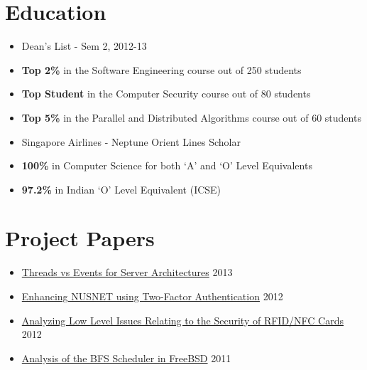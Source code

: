 \documentclass[11pt,a4paper]{moderncv}
\begin{document}
\section{Education}
{\begin{itemize}
    \item Dean's List - Sem 2, 2012-13
    \item \textbf{Top 2\%} in the Software Engineering course out of 250 students
    \item \textbf{Top Student} in the Computer Security course out of 80 students
    \item \textbf{Top 5\%} in the Parallel and Distributed Algorithms course out of 60 students
    \item Singapore Airlines - Neptune Orient Lines Scholar
 \end{itemize}}
{\begin{itemize}
            \item \textbf{100\%} in Computer Science for both `A' and `O' Level Equivalents
            \item \textbf{97.2\%} in Indian `O' Level Equivalent (ICSE)
 \end{itemize}}
\section{Project Papers}
\begin{itemize}
\item \href{http://vellvisher.github.io/papers_reports/doc/Threads_vs_Events_Server_Architectures.pdf}{Threads vs Events for Server Architectures} \hfill 2013
\item \href{http://vellvisher.github.io/papers_reports/doc/NUS_2FA_GA.pdf}{Enhancing NUSNET using Two-Factor Authentication} \hfill 2012
\item \href{http://vellvisher.github.io/papers_reports/doc/RFID_NFC.pdf}{Analyzing Low Level Issues Relating to the Security of RFID/NFC Cards} \hfill 2012
\item \href{http://vellvisher.github.io/papers_reports/doc/BFS_FreeBSD.pdf}{Analysis of the BFS Scheduler in FreeBSD} \hfill 2011
\end{itemize}
\end{document}
